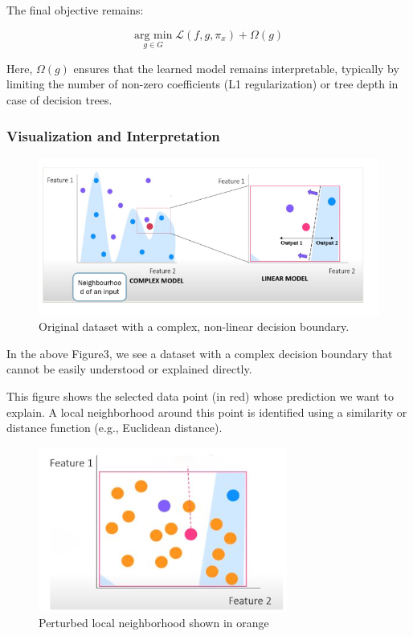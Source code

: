 \documentclass[conference,letterpaper]{IEEEtran}
\begin{document}
The final objective remains:

\[
\underset{g \in G}{\text{arg min}} \; \mathcal{L}(f, g, \pi_x) + \Omega(g)
\]

Here, \( \Omega(g) \) ensures that the learned model remains interpretable, typically by limiting the number of non-zero coefficients (L1 regularization) or tree depth in case of decision trees.



\subsubsection*{Visualization and Interpretation}

\begin{figure}[h]
    \centering
    \includegraphics[width=\linewidth]{lime-1.png}
    \caption{Original dataset with a complex, non-linear decision boundary.}
\end{figure}
In the above Figure3, we see a dataset with a complex decision boundary that cannot be easily understood or explained directly.


This figure shows the selected data point (in red) whose prediction we want to explain. A local neighborhood around this point is identified using a similarity or distance function (e.g., Euclidean distance).

\begin{figure}[h]
    \centering
    \includegraphics[width=\linewidth]{lime-2.png}
    \caption{Perturbed local neighborhood shown in orange}
\end{figure}
\end{document}
